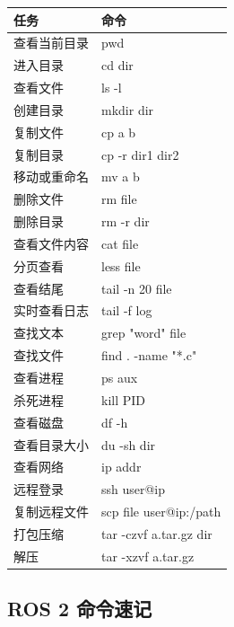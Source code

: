 \documentclass[UTF8,a4paper,12pt]{ctexart}
\begin{document}
\begin{longtable}{p{4cm}p{10cm}}
\toprule
任务 & 命令 \\
\midrule
查看当前目录 & pwd \\
进入目录 & cd dir \\
查看文件 & ls -l \\
创建目录 & mkdir dir \\
复制文件 & cp a b \\
复制目录 & cp -r dir1 dir2 \\
移动或重命名 & mv a b \\
删除文件 & rm file \\
删除目录 & rm -r dir \\
查看文件内容 & cat file \\
分页查看 & less file \\
查看结尾 & tail -n 20 file \\
实时查看日志 & tail -f log \\
查找文本 & grep "word" file \\
查找文件 & find . -name "*.c" \\
查看进程 & ps aux \\
杀死进程 & kill PID \\
查看磁盘 & df -h \\
查看目录大小 & du -sh dir \\
查看网络 & ip addr \\
远程登录 & ssh user@ip \\
复制远程文件 & scp file user@ip:/path \\
打包压缩 & tar -czvf a.tar.gz dir \\
解压 & tar -xzvf a.tar.gz \\
\bottomrule
\end{longtable}

\subsection{ROS 2 命令速记}
\end{document}
